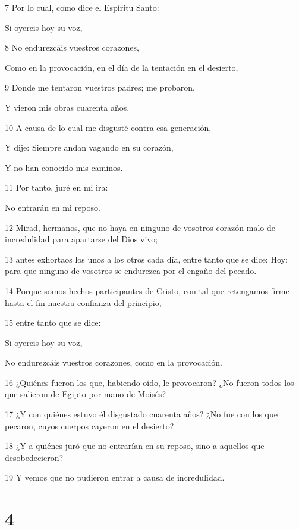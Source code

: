\par 7 Por lo cual, como dice el Espíritu Santo:
\par Si oyereis hoy su voz,
\par 8 No endurezcáis vuestros corazones,
\par Como en la provocación, en el día de la tentación en el desierto,
\par 9 Donde me tentaron vuestros padres; me probaron,
\par Y vieron mis obras cuarenta años.
\par 10 A causa de lo cual me disgusté contra esa generación,
\par Y dije: Siempre andan vagando en su corazón,
\par Y no han conocido mis caminos.
\par 11 Por tanto, juré en mi ira:
\par No entrarán en mi reposo.
\par 12 Mirad, hermanos, que no haya en ninguno de vosotros corazón malo de incredulidad para apartarse del Dios vivo;
\par 13 antes exhortaos los unos a los otros cada día, entre tanto que se dice: Hoy; para que ninguno de vosotros se endurezca por el engaño del pecado.
\par 14 Porque somos hechos participantes de Cristo, con tal que retengamos firme hasta el fin nuestra confianza del principio,
\par 15 entre tanto que se dice:
\par Si oyereis hoy su voz,
\par No endurezcáis vuestros corazones, como en la provocación.
\par 16 ¿Quiénes fueron los que, habiendo oído, le provocaron? ¿No fueron todos los que salieron de Egipto por mano de Moisés?
\par 17 ¿Y con quiénes estuvo él disgustado cuarenta años? ¿No fue con los que pecaron, cuyos cuerpos cayeron en el desierto?
\par 18 ¿Y a quiénes juró que no entrarían en su reposo, sino a aquellos que desobedecieron?
\par 19 Y vemos que no pudieron entrar a causa de incredulidad.

\chapter{4}

